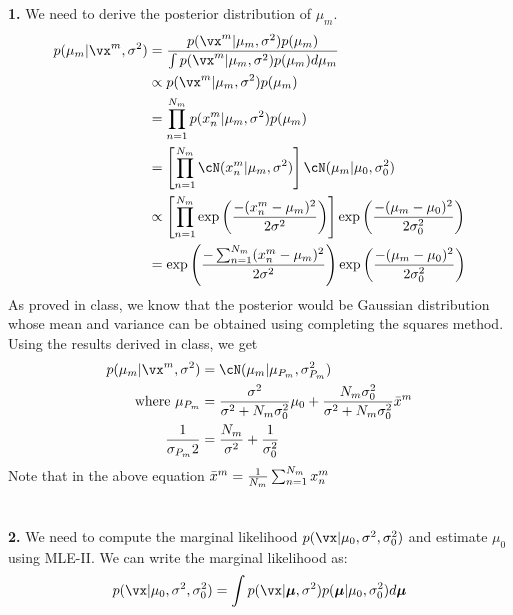 \documentclass[a4paper,11pt]{article}
\begin{document}
\begin{pmisolution}
\noindent \textbf{1.} We need to derive the posterior distribution of $\mu_m$.
\begin{equation*}
    \begin{split}
    p(\mu_m|\vx^{m},\sigma^2) &= \frac{p(\vx^{m}|\mu_m, \sigma^2)p(\mu_m)}{\int p(\vx^{m}|\mu_m, \sigma^2)p(\mu_m) d\mu_m} \\
    & \propto p(\vx^{m}|\mu_m, \sigma^2)p(\mu_m) \\
    &= \prod_{n=1}^{N_m} p(x_n^{m}|\mu_m, \sigma^2)p(\mu_m) \\
    &= \left[ \prod_{n=1}^{N_m} \cN(x_n^{m}|\mu_m,\sigma^2) \right] \cN(\mu_m|\mu_0, \sigma_0^2) \\
    &\propto \left[ \prod_{n=1}^{N_m} \exp \left( \frac{-(x_n^{m} - \mu_m)^2}{2\sigma^2} \right) \right] \exp \left( \frac{-(\mu_m - \mu_0)^2}{2\sigma_0^2} \right) \\
    &= \exp \left( \frac{-\sum_{n=1}^{N_m}  (x_n^{m} - \mu_m)^2}{2\sigma^2} \right) \exp \left( \frac{-(\mu_m - \mu_0)^2}{2\sigma_0^2} \right)
    \end{split}
\end{equation*}
As proved in class, we know that the posterior would be Gaussian distribution whose mean and variance can be obtained using completing the squares method. Using the results derived in class, we get
\begin{equation*}
    \begin{split}
        p(\mu_m|\vx^{m},\sigma^2) &= \cN(\mu_m | \mu_{P_m}, \sigma_{P_m}^2) \\
        \text{where } \mu_{P_m} &= \frac{\sigma^2}{\sigma^2 + N_m\sigma_0^2}\mu_0 + \frac{N_m\sigma_0^2}{\sigma^2 + N_m\sigma_0^2}\Bar{x}^m \\
        \frac{1}{\sigma_{P_m}{2}} &= \frac{N_m}{\sigma^2} + \frac{1}{\sigma_0^2}
    \end{split}
\end{equation*}
Note that in the above equation $\Bar{x}^m = \frac{1}{N_m} \sum_{n=1}^{N_m} x_n^m$
\\ \\ \\
\noindent \textbf{2.} We need to compute the marginal likelihood $p(\vx | \mu_0, \sigma^2, \sigma_0^2)$ and estimate $\mu_0$ using MLE-II. We can write the marginal likelihood as:
\begin{equation*}
    \begin{split}
        p(\vx | \mu_0, \sigma^2, \sigma_0^2) &= \int p(\vx|\boldsymbol{\mu}, \sigma^2)p(\boldsymbol{\mu}|\mu_0,\sigma_0^2)d\boldsymbol{\mu} \\

\end{split}
\end{equation*}
\end{pmisolution}
\end{document}
